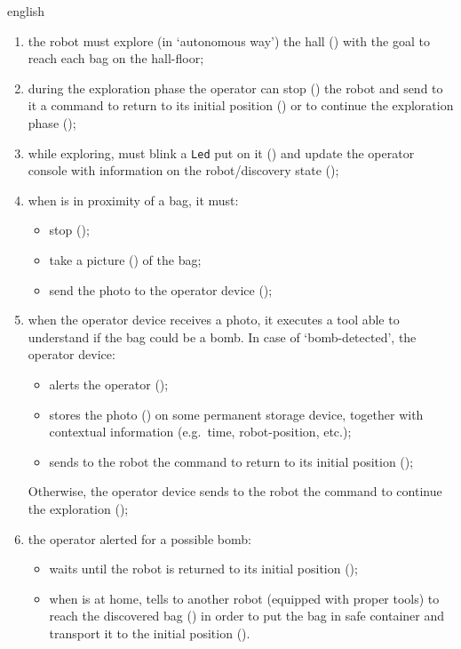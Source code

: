 \begin{foreigndisplayquote}{english}
  \begin{enumerate}
    \item
      the robot must explore (in `autonomous way') the hall () with the goal to reach each bag on the hall-floor;
    \item
      during the exploration phase the operator can stop () the robot and send to it a command to return to its initial position () or to continue the exploration phase ();
    \item
      while exploring,  must blink a \texttt{Led} put on it () and update the operator console with information on the robot/discovery state ();
    \item
      when  is in proximity of a bag, it must:
      \begin{itemize}
        \item stop ();
        \item take a picture () of the bag;
        \item send the photo to the operator device ();
      \end{itemize}
    \item
        when the operator device receives a photo, it executes a tool able to understand if the bag could be a bomb.
        In case of `bomb-detected', the operator device:
        \begin{itemize}
          \item alerts the operator ();
          \item stores the photo () on some permanent storage device, together with contextual information (e.g.\ time, robot-position, etc.);
          \item sends to the robot the command to return to its initial position ();
        \end{itemize}
        Otherwise, the operator device sends to the robot the command to continue the exploration ();
    \item
      the operator alerted for a possible bomb:
      \begin{itemize}
        \item waits until the robot is returned to its initial position ();
        \item when  is at home, tells to \hypertarget{req:retriever}{another robot} (equipped with proper tools) to reach the discovered bag () in order to put the bag in safe container and transport it to the initial position ().
      \end{itemize}
  \end{enumerate}
\end{foreigndisplayquote}
